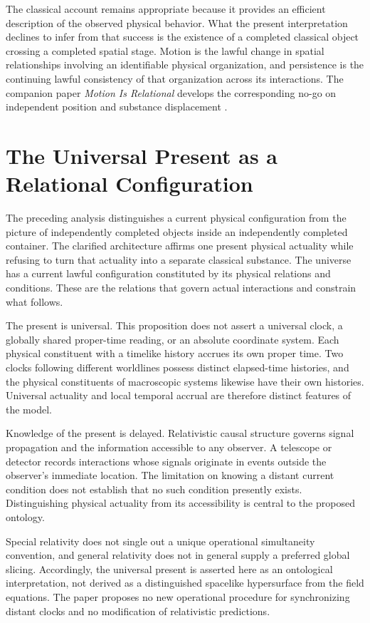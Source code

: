 \documentclass[12pt,onecolumn]{article}
\begin{document}
The classical account remains appropriate because it provides an efficient description of the observed physical behavior. What the present interpretation declines to infer from that success is the existence of a completed classical object crossing a completed spatial stage. Motion is the lawful change in spatial relationships involving an identifiable physical organization, and persistence is the continuing lawful consistency of that organization across its interactions. The companion paper \textit{Motion Is Relational} develops the corresponding no-go on independent position and substance displacement \cite{MotionRelational2026}.

\section{The Universal Present as a Relational Configuration}

The preceding analysis distinguishes a current physical configuration from the picture of independently completed objects inside an independently completed container. The clarified architecture affirms one present physical actuality while refusing to turn that actuality into a separate classical substance. The universe has a current lawful configuration constituted by its physical relations and conditions. These are the relations that govern actual interactions and constrain what follows.

The present is universal. This proposition does not assert a universal clock, a globally shared proper-time reading, or an absolute coordinate system. Each physical constituent with a timelike history accrues its own proper time. Two clocks following different worldlines possess distinct elapsed-time histories, and the physical constituents of macroscopic systems likewise have their own histories. Universal actuality and local temporal accrual are therefore distinct features of the model.

Knowledge of the present is delayed. Relativistic causal structure governs signal propagation and the information accessible to any observer. A telescope or detector records interactions whose signals originate in events outside the observer's immediate location. The limitation on knowing a distant current condition does not establish that no such condition presently exists. Distinguishing physical actuality from its accessibility is central to the proposed ontology.

Special relativity does not single out a unique operational simultaneity convention, and general relativity does not in general supply a preferred global slicing. Accordingly, the universal present is asserted here as an ontological interpretation, not derived as a distinguished spacelike hypersurface from the field equations. The paper proposes no new operational procedure for synchronizing distant clocks and no modification of relativistic predictions.
\end{document}
